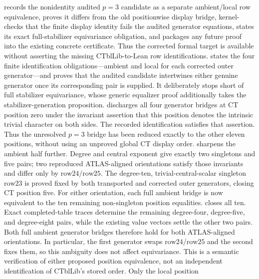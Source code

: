 \documentclass[11pt]{article}
\begin{document}
 records the
nonidentity audited \(p=3\) candidate as a separate ambient/local row
equivalence, proves it differs from the old positionwise display bridge,
kernel-checks that the finite display identity fails the audited generator
equations,
states its exact full-stabilizer equivariance obligation, and packages any
future proof into the existing concrete certificate.  Thus the corrected
formal target is available without asserting the missing CTblLib-to-Lean
row identifications.
 states the
four finite identification obligations---ambient and local for
each corrected outer generator---and proves that the audited candidate
intertwines either genuine generator once its corresponding pair is
supplied.  It deliberately stops short of full stabilizer equivariance,
whose generic equalizer proof additionally takes the
stabilizer-generation proposition.
 discharges all
four generator bridges at CT position zero under the invariant assertion
that this position denotes the intrinsic trivial character on both sides.
The recorded identification satisfies that assertion.  Thus the unresolved
\(p=3\) bridge has been reduced exactly to the other eleven positions,
without using an unproved global CT display order.
 sharpens the
ambient half further.  Degree and central exponent give exactly two
singletons and five pairs; two reproduced ATLAS-aligned orientations satisfy
those invariants and differ only by \(\mathrm{row24}/\mathrm{row25}\).
The degree-ten, trivial-central-scalar singleton \(\mathrm{row23}\) is
proved fixed by both transported and corrected outer generators, closing
CT position five.  For either orientation, each full ambient bridge is now
equivalent to the ten remaining non-singleton position equalities.
 closes all ten.
Exact completed-table traces determine the remaining degree-four,
degree-five, and degree-eight pairs, while the existing value vectors
settle the other two pairs.  Both full ambient generator bridges therefore
hold for both ATLAS-aligned orientations.  In particular, the first
generator swaps \(\mathrm{row24}/\mathrm{row25}\) and the second fixes
them, so this ambiguity does not affect equivariance.  This is a semantic
verification of either proposed position equivalence, not an independent
identification of CTblLib's stored order.  Only the local position
\end{document}
